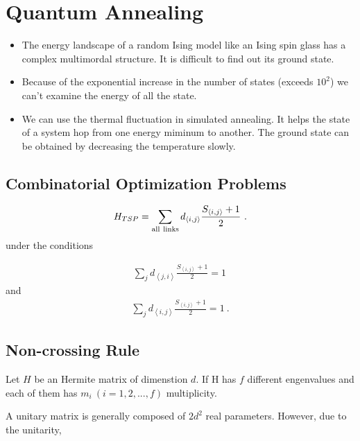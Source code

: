 \documentclass[a4j,11pt]{jarticle}
\begin{document}
\section{Quantum Annealing}
\begin{itemize}
  \item The energy landscape of a random Ising model like an Ising spin glass has a complex multimordal structure. It is difficult to find out its ground state.
  \item Because of the exponential increase in the number of states (exceeds $10^2$) we can't examine the energy of all the state.
  \item We can use the thermal fluctuation in simulated annealing. It helps the state of a system hop from one energy miminum to another. The ground state can be obtained by decreasing the temperature slowly.
\end{itemize}

\subsection{Combinatorial Optimization Problems}

\begin{eqnarray}
  H_{TSP} = \sum_{{\rm all \ links}} d_{\left <i, j \right >} \frac{S_{\left < i, j \right >} + 1}{2} \ .
\end{eqnarray}
under the conditions

\begin{eqnarray}
 \sum_{j} d_{\left <j, i \right >} \frac{S_{\left < i, j \right >} + 1}{2} = 1 \,
\end{eqnarray}
and
\begin{eqnarray}
 \sum_{j} d_{\left <i, j \right >} \frac{S_{\left < i, j \right >} + 1}{2} = 1 \ .
\end{eqnarray}

\subsection{Non-crossing Rule}

Let $H$ be an Hermite matrix of dimenstion $d$. If H has $f$ different engenvalues and each of them has $m_i \ (i = 1, 2, ..., f)$  multiplicity.

A unitary matrix is generally composed of $2d^2$ real parameters. However, due to the unitarity,
\end{document}
